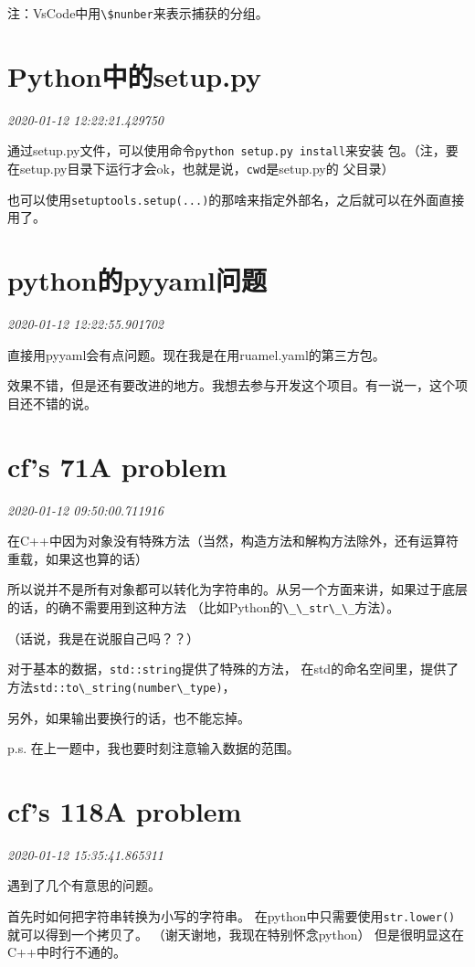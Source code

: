 \documentclass{peterlitsdoc}
\newcommand{\timetx}[1]
    {\par\noindent\emph{\pltgray\small #1}\vspace{2em}}
\newcommand{\vb}{\verb}
\begin{document}
注：VsCode中用\vb|\$nunber|来表示捕获的分组。



\section{Python中的setup.py}\timetx{2020-01-12 12:22:21.429750}

通过setup.py文件，可以使用命令\vb|python setup.py install|来安装
包。（注，要在setup.py目录下运行才会ok，也就是说，\vb|cwd|是setup.py的
父目录）

也可以使用\vb|setuptools.setup(...)|的那啥来指定外部名，之后就可以在外面直接用了。


\section{python的pyyaml问题}\timetx{2020-01-12 12:22:55.901702}

直接用pyyaml会有点问题。现在我是在用ruamel.yaml的第三方包。

效果不错，但是还有要改进的地方。我想去参与开发这个项目。有一说一，这个项目还不错的说。



\section{cf's 71A problem}\timetx{2020-01-12 09:50:00.711916}

在C++中因为对象没有特殊方法（当然，构造方法和解构方法除外，还有运算符重载，如果这也算的话）

所以说并不是所有对象都可以转化为字符串的。从另一个方面来讲，如果过于底层的话，的确不需要用到这种方法
（比如Python的\vb|\_\_str\_\_|方法）。

（话说，我是在说服自己吗？？）

对于基本的数据，\vb|std::string|提供了特殊的方法，
在std的命名空间里，提供了方法\vb|std::to\_string(number\_type)|，

另外，如果输出要换行的话，也不能忘掉。

p.s. 在上一题中，我也要时刻注意输入数据的范围。


\section{cf's 118A problem}\timetx{2020-01-12 15:35:41.865311}

 遇到了几个有意思的问题。

 首先时如何把字符串转换为小写的字符串。
 在python中只需要使用\vb|str.lower()|就可以得到一个拷贝了。
 （谢天谢地，我现在特别怀念python）
 但是很明显这在C++中时行不通的。
\end{document}
